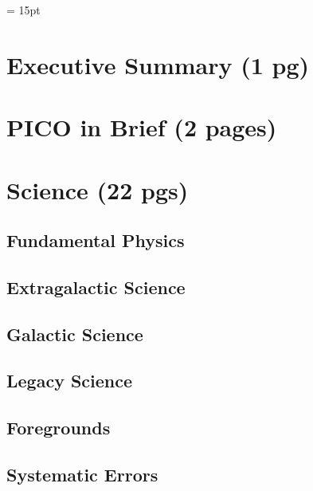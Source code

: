\documentclass[12pt]{article}
\begin{document}


\setlength{\baselineskip}{0.96\baselineskip} %
\setlength{\parskip}{1.\parskip}

\parindent = 15pt

\tableofcontents

\setcounter{page}{0}
\setcounter{figure}{0}

\newpage

\section{Executive Summary (1 pg)} 


\section{PICO in Brief (2 pages)}


\section{Science (22 pgs)}

\subsection{Fundamental Physics}


\subsection{Extragalactic Science}


\subsection{Galactic Science}


\subsection{Legacy Science}


\subsection{Foregrounds}


\subsection{Systematic Errors}

\end{document}
